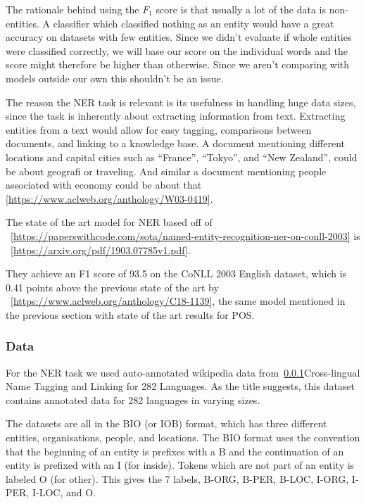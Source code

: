The rationale behind using the $F_1$ score is that usually a lot of the data is
non-entities. A classifier which classified nothing as an entity would have a
great accuracy on datasets with few entities. Since we didn't evaluate if whole
entities were classified correctly, we will base our score on the individual
words and the score might therefore be higher than otherwise. Since we aren't
comparing with models outside our own this shouldn't be an issue.

The reason the NER task is relevant is its usefulness in handling huge data
sizes, since the task is inherently about extracting information from text.
Extracting entities from a text would allow for easy tagging, comparisons
between documents, and linking to a knowledge base. A document mentioning
different locations and capital cities such as ``France'', ``Tokyo'', and ``New
Zealand'', could be about geografi or traveling. And similar a document
mentioning people associated with economy could be about that
\ref{https://www.aclweb.org/anthology/W03-0419}. 

The state of the art model for NER based off of
~\ref{https://paperswithcode.com/sota/named-entity-recognition-ner-on-conll-2003}
is ~\ref{https://arxiv.org/pdf/1903.07785v1.pdf}.


They achieve an F1 score of 93.5 on the CoNLL 2003 English dataset, which is
0.41 points above the previous state of the art by
~\ref{https://www.aclweb.org/anthology/C18-1139}, the same model mentioned in
the previous section with state of the art results for POS.

\subsubsection{Data}

For the NER task we used auto-annotated wikipedia data from~\ref{}{Cross-lingual
Name Tagging and Linking for 282 Languages}. As the title suggests, this dataset
contains annotated data for 282 languages in varying sizes. 

The datasets are all in the BIO (or IOB) format, which has three different
entities, organisations, people, and locations. The BIO format uses the
convention that the beginning of an entity is prefixes with a B and the
continuation of an entity is prefixed with an I (for inside). Tokens which are
not part of an entity is labeled O (for other). This gives the 7 labels, B-ORG,
B-PER, B-LOC, I-ORG, I-PER, I-LOC, and O. 

